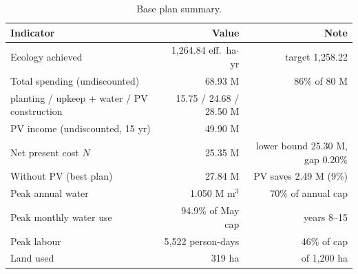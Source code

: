\documentclass[11pt,a4paper]{article}
\begin{document}
\begin{table}[H]\centering\small
\begin{tabular}{@{}lrr@{}}
\toprule
Indicator & Value & Note\\
\midrule
Ecology achieved & 1,264.84 eff.\ ha$\cdot$yr & target 1,258.22\\
Total spending (undiscounted) & 68.93 M & 86\% of 80 M\\
\quad planting / upkeep + water / PV construction & 15.75 / 24.68 / 28.50 M & \\
PV income (undiscounted, 15 yr) & 49.90 M & \\
Net present cost $N$ & 25.35 M & lower bound 25.30 M, gap 0.20\%\\
Without PV (best plan) & 27.84 M & PV saves 2.49 M (9\%)\\
Peak annual water & 1.050 M m$^3$ & 70\% of annual cap\\
Peak monthly water use & 94.9\% of May cap & years 8--15\\
Peak labour & 5,522 person-days & 46\% of cap\\
Land used & 319 ha & of 1,200 ha\\
\bottomrule
\end{tabular}
\caption{Base plan summary.}
\end{table}
\end{document}
